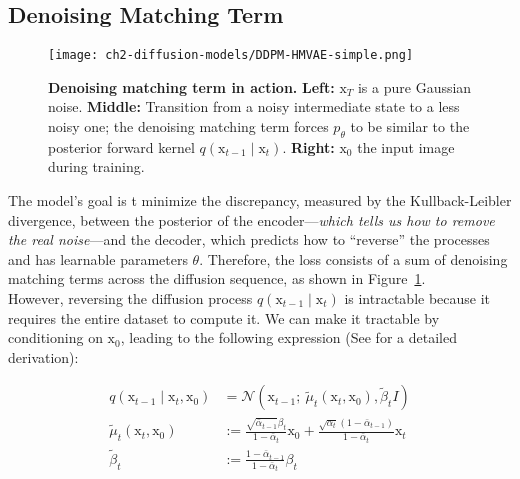\subsection{Denoising Matching Term}

\begin{figure}[t]
  \centering
  \texttt{[image: ch2-diffusion-models/DDPM-HMVAE-simple.png]}
  \captionsetup{width=\textwidth} %
  \caption{\textbf{Denoising matching term in action.} \textbf{Left:} $\mathrm{x}_{T}$ is a pure Gaussian noise. \textbf{Middle:} Transition from a noisy intermediate state to a less noisy one; the denoising matching term forces $p_{\theta}$ to be similar to the posterior forward kernel $q(\mathrm{x}_{t-1}\mid \mathrm{x}_{t})$. \textbf{Right:} $\mathrm{x}_{0}$ the input image during training.}
  \label{fig:ddpm-denoising-term}
\end{figure}

The model's goal is t minimize the discrepancy, measured by the Kullback-Leibler divergence, between the posterior of the encoder---\textit{which tells us how to remove the real noise}---and the decoder, which predicts how to ``reverse'' the processes and has learnable parameters $\theta$. Therefore, the loss consists of a sum of denoising matching terms across the diffusion sequence, as shown in Figure~\ref{fig:ddpm-denoising-term}. \\

\noindent However, reversing the diffusion process $q(\mathrm{x}_{t-1}\mid\mathrm{x}_{t})$ is intractable because it requires the entire dataset to compute it. We can make it tractable by conditioning on $\mathrm{x}_{0}$, leading to the following expression (See \citep{weng2021diffusion} for a detailed derivation):

\begin{align}\label{eqn:reverse-forward-process}
    q(\mathrm{x}_{t-1}\mid\mathrm{x}_{t}, \mathrm{x}_{0}) &= \mathcal{N}(\mathrm{x}_{t-1};~\tilde{\mu}_{t}(\mathrm{x}_{t}, \mathrm{x}_{0}), \tilde{\beta}_{t}I) \\
    \tilde{\mu}_{t}(\mathrm{x}_{t}, \mathrm{x}_{0}) &:= \frac{\sqrt{\bar{\alpha}_{t-1}}\beta_{t}}{1-\bar{\alpha}_{t}}\mathrm{x}_{0} + \frac{\sqrt{\alpha_{t}}(1 - \bar{\alpha}_{t-1})}{1-\bar{\alpha}_{t}}\mathrm{x}_{t} \\
    \tilde{\beta}_{t} &:= \frac{1-\bar{\alpha}_{t-1}}{1-\bar{\alpha}_{t}}\beta_{t}
\end{align}

